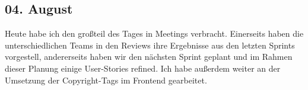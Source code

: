 \subsection{04. August}
Heute habe ich den großteil des Tages in Meetings verbracht. Einerseits haben die unterschiedlichen Teams in den Reviews ihre Ergebnisse aus den letzten Sprints vorgestell, andererseits haben wir den nächsten Sprint geplant und im Rahmen dieser Planung einige User-Stories refined. Ich habe außerdem weiter an der Umsetzung der Copyright-Tags im Frontend gearbeitet.